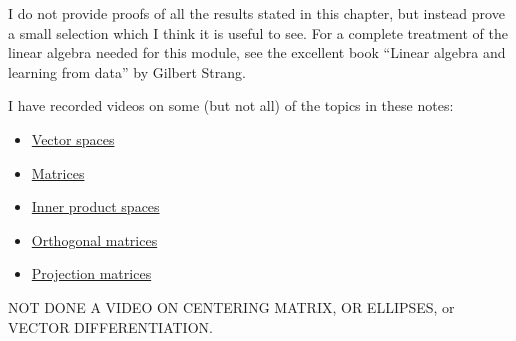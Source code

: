 \documentclass[]{book}
\providecommand{\tightlist}{%
  \setlength{\itemsep}{0pt}\setlength{\parskip}{0pt}}
\theoremstyle{definition}
\theoremstyle{definition}
\theoremstyle{definition}
\theoremstyle{remark}
\begin{document}
I do not provide proofs of all the results stated in this chapter, but instead prove a small selection which I think it is useful to see. For a complete treatment of the linear algebra needed for this module, see the excellent book ``Linear algebra and learning from data'' by Gilbert Strang.

I have recorded videos on some (but not all) of the topics in these notes:

\begin{itemize}
\tightlist
\item
  \href{https://mediaspace.nottingham.ac.uk/media/Vector+Spaces/1_48xqrp04}{Vector spaces}
\item
  \href{https://mediaspace.nottingham.ac.uk/media/Matrices/1_nqo2u7zs}{Matrices}
\item
  \href{https://mediaspace.nottingham.ac.uk/media/Inner+Product+Spaces/1_nhcbybg3}{Inner product spaces}
\item
  \href{https://mediaspace.nottingham.ac.uk/media/Orthogonal+Matrices/1_rr2ervcs}{Orthogonal matrices}
\item
  \href{https://mediaspace.nottingham.ac.uk/media/Projection/1_soh726fg}{Projection matrices}
\end{itemize}

NOT DONE A VIDEO ON CENTERING MATRIX, OR ELLIPSES, or VECTOR DIFFERENTIATION.

\renewcommand{\bY}{\boldsymbol Y}
\renewcommand{\bx}{\boldsymbol x}
\renewcommand{\bX}{\boldsymbol X}
\renewcommand{\bH}{\boldsymbol H}
\renewcommand{\by}{\boldsymbol y}
\renewcommand{\bz}{\boldsymbol z}
\renewcommand{\bS}{\boldsymbol S}
\renewcommand{\bR}{\boldsymbol R}
\renewcommand{\bmu}{\boldsymbol \mu}
\renewcommand{\bSigma}{\boldsymbol \Sigma}
\renewcommand{\bLambda}{\boldsymbol \Lambda}
\renewcommand{\bgamma}{\boldsymbol \gamma}
\renewcommand{\blambda}{\boldsymbol \lambda}
\renewcommand{\bA}{\boldsymbol A}
\renewcommand{\bB}{\boldsymbol B}
\renewcommand{\bD}{\boldsymbol D}
\renewcommand{\bC}{\boldsymbol C}
\renewcommand{\bR}{\boldsymbol R}
\renewcommand{\bM}{\boldsymbol M}
\renewcommand{\bP}{\boldsymbol P}
\renewcommand{\bQ}{\boldsymbol Q}
\renewcommand{\bT}{\boldsymbol T}
\renewcommand{\bW}{\boldsymbol W}
\renewcommand{\ba}{\boldsymbol a}
\renewcommand{\bb}{\boldsymbol b}
\renewcommand{\bc}{\boldsymbol c}
\renewcommand{\bd}{\boldsymbol d}
\renewcommand{\bh}{\boldsymbol h}
\renewcommand{\bp}{\boldsymbol p}
\renewcommand{\bq}{\boldsymbol q}
\renewcommand{\bu}{\boldsymbol u}
\renewcommand{\bzero}{\boldsymbol 0}
\renewcommand{\mR}{\mathbb R}
\renewcommand{\cR}{\mathcal R}
\end{document}
